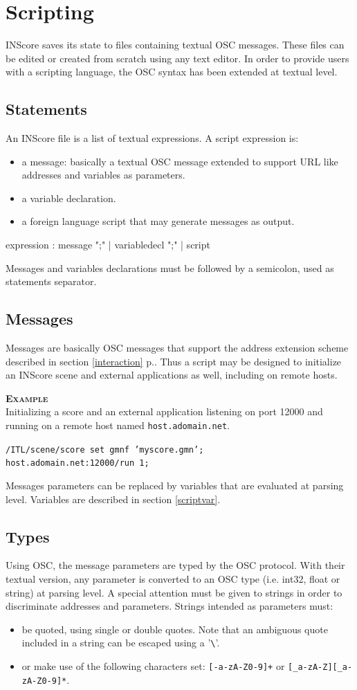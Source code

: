 \documentclass[a4paper,twoside]{report}
\newcommand{\toplevel}[1]	{\chapter{#1}}
\newcommand{\sublevel}[1]	{\section{#1}}
\newcommand{\fullref}[1]	{\ref{#1} p.\pageref{#1}}
\newcommand{\OSC}[1]		{\texttt{#1}}
\newcommand{\example}		{\textbf{\hspace{-1.5cm}\textbf{\textsc{Example }}}}
\newcommand{\sample}	[1]			{\vspace{-2mm}\begin{center}\colorbox{mygrey}{
								\begin{minipage}[t]{0.9\columnwidth} 
								{\small \texttt{#1}}
								\end{minipage}}\end{center}}
\begin{document}
\toplevel{Scripting}
\label{scripting}

INScore saves its state to files containing textual OSC messages. These files can be edited or created from scratch using any text editor. In order to provide users with a scripting language, the OSC syntax has been extended at textual level.

\sublevel{Statements}\label{scriptstatement}
An INScore file is a list of textual expressions. A script expression is:
\begin{itemize}
\item a message: basically a textual OSC message extended to support URL like addresses and variables as parameters.
\item a variable declaration.
\item a foreign language script that may generate messages as output.
\end{itemize}

\begin{rail}
expression :  
		 	message ";"
		| 	variabledecl ";"
		| 	script
\end{rail}

Messages and variables declarations must be followed by a semicolon, used as statements separator.

\sublevel{Messages}\label{scriptmsgs}

Messages are basically OSC messages that support the address extension scheme described in section \fullref{interaction}.
Thus a script may be designed to initialize an INScore scene and external applications as well, including on remote hosts.

\example\\
Initializing a score and an external application listening on port 12000 and running on a remote host named \OSC{host.adomain.net}.
\sample{/ITL/scene/score set gmnf 'myscore.gmn';\\
host.adomain.net:12000/run 1;
}

Messages parameters can be replaced by variables that are evaluated at parsing level. Variables are described in section \ref{scriptvar}.

\sublevel{Types}\label{scripttypes}

Using OSC, the message parameters are typed by the OSC protocol. 
With their textual version, any parameter is converted to an OSC type (i.e. int32, float or string) at parsing level.
A special attention must be given to strings in order to discriminate addresses and parameters. Strings intended as parameters must:
\begin{itemize}
\item be quoted, using single or double quotes. Note that an ambiguous quote included in a string can be escaped using a '\verb+\+'.
\item or make use of the following characters set: \OSC{[-a-zA-Z0-9]+} or \OSC{[\_a-zA-Z][\_a-zA-Z0-9]*}.
 \end{itemize}
\end{document}
